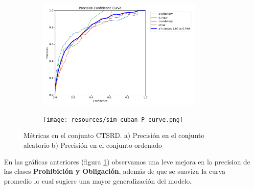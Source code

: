 \documentclass{article}
\begin{document}
\begin{figure}[h]
\begin{subfigure}[b]{0.5\textwidth}
\centering
\includegraphics[width=0.9\textwidth]{resources/random cuban P curve.png}
\caption{}
\end{subfigure}
\begin{subfigure}[b]{0.5\textwidth}
\centering
\texttt{[image: resources/sim cuban P  curve.png]}
\caption{}
\end{subfigure}
\caption{Métricas en el conjunto CTSRD. a) Precisión en el conjunto aleatorio b) Precisión en el conjunto ordenado}
\label{fig:precision random vs precision sim}
\end{figure}

En las gráficas anteriores (figura \ref{fig:precision random vs precision sim}) observamos una leve mejora en la precision de las clases \textbf{Prohibición y Obligación}, además de que se suaviza la curva promedio lo cual sugiere una mayor generalización del modelo.
\end{document}
